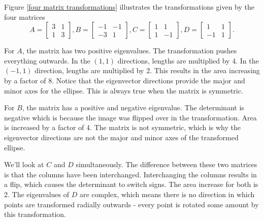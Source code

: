 \begin{example}\label{details for four}

Figure \ref{four matrix transformations} illustrates the transformations given by  the four matrices 
$$A = 
\begin{bmatrix}
3&1\\1&3
\end{bmatrix}
,
B = 
\begin{bmatrix}
-1&-1\\-3&1
\end{bmatrix}
,
C = 
\begin{bmatrix}
1&1\\1&-1
\end{bmatrix}
,
D = 
\begin{bmatrix}
1&1\\-1&1
\end{bmatrix}
.$$ 

For $A$, the matrix has two positive eigenvalues. The transformation pushes everything outwards.  In the $(1,1)$ directions, lengths are multiplied by 4.  In the $(-1,1)$ direction, lengths are multiplied by 2.  This results in the area increasing by a factor of 8.  Notice that the eigenvector directions provide the major and minor axes for the ellipse.  This is always true when the matrix is symmetric.

For $B$, the matrix has a positive and negative eigenvalue.  The determinant is negative which is because the image was flipped over in the transformation.  Area is increased by a factor of 4.  The matrix is not symmetric, which is why the eigenvector directions are not the major and minor axes of the transformed ellipse.

We'll look at $C$ and $D$ simultaneously.  The difference between these two matrices is that the columns have been interchanged. Interchanging the columns results in a flip, which causes the determinant to switch signs. The area increase for both is 2.  The eigenvalues of $D$ are complex, which means there is no direction in which points are transformed radially outwards - every point is rotated some amount by this transformation.      

\newcommand{\myvfplotheight}{1.8in}
\begin{figure}
\begin{tikzpicture}


\end{tikzpicture}
\end{figure}
\end{example}

